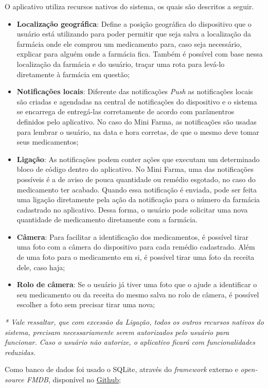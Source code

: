 O aplicativo utiliza recursos nativos do sistema, os quais são descritos a seguir. 
\begin{itemize}
	\item \textbf{Localização geográfica}: Define a posição geográfica do dispositivo que o usuário está utilizando para poder permitir
    que seja salva a localização da farmácia onde ele comprou um medicamento para, caso seja necessário, explicar para alguém onde a 
    farmácia fica. Também é possível com base nessa localização da farmácia e do usuário, traçar uma rota para levá-lo diretamente à 
    farmácia em questão;
	\item \textbf{Notificações locais}: Diferente das notificações \textit{Push} as notificações locais são criadas e agendadas na central 
    de notificações do dispositivo e o sistema se encarrega de entregá-las corretamente de acordo com parâmentros definidos pelo aplicativo. 
    No caso do Mini Farma, as notificações são usadas para lembrar o usuário, na data e hora corretas, de que o mesmo deve tomar seus medicamentos;
	\item \textbf{Ligação}: As notificações podem conter ações que executam um determinado bloco de código dentro do aplicativo. No Mini Farma, 
    uma das notificações possíveis é a de aviso de pouca quantidade ou remédio esgotado, no caso do medicamento ter acabado. 
    Quando essa notificação é enviada, pode ser feita uma ligação diretamente pela ação da notificação para o número da 
    farmácia cadastrado no aplicativo. Dessa forma, o usuário pode solicitar uma nova quantidade de medicamento diretamente com a farmácia. 
	\item \textbf{Câmera}: Para facilitar a identificação dos medicamentos, é possível tirar uma foto com a câmera do dispositivo para 
    cada remédio cadastrado. Além de uma foto para o medicamento em si, é possível tirar uma foto da receita dele, caso haja;
    \item \textbf{Rolo de câmera}: Se o usuário já tiver uma foto que o ajude a identificar o seu medicamento ou da receita do mesmo salva 
    no rolo de câmera, é possível escolher a foto sem precisar tirar uma nova;
\end{itemize}

\textit{* Vale ressaltar, que com excessão da Ligação, todos os outros recursos nativos do sistema, precisam necessariamente serem autorizados pelo
usuário para funcionar. Caso o usuário não autorize, o aplicativo ficará com funcionalidades reduzidas.} 


Como banco de dados foi usado o SQLite, através do \textit{framework} externo e \textit{open-source FMDB}, 
disponível no \href{https://github.com/ccgus/fmdb}{Github};

